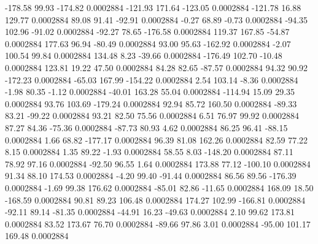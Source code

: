      -178.58       99.93     -174.82     0.0002884
     -121.93      171.64     -123.05     0.0002884
     -121.78       16.88      129.77     0.0002884
       89.08       91.41      -92.91     0.0002884
       -0.27       68.89       -0.73     0.0002884
      -94.35      102.96      -91.02     0.0002884
      -92.27       78.65     -176.58     0.0002884
      119.37      167.85      -54.87     0.0002884
      177.63       96.94      -80.49     0.0002884
       93.00       95.63     -162.92     0.0002884
       -2.07      100.54       99.84     0.0002884
      134.48        8.23      -39.66     0.0002884
     -176.49      102.70      -10.48     0.0002884
      123.81       19.22       47.50     0.0002884
       84.28       82.65      -87.57     0.0002884
       94.32       90.92     -172.23     0.0002884
      -65.03      167.99     -154.22     0.0002884
        2.54      103.14       -8.36     0.0002884
       -1.98       80.35       -1.12     0.0002884
      -40.01      163.28       55.04     0.0002884
     -114.94       15.09       29.35     0.0002884
       93.76      103.69     -179.24     0.0002884
       92.94       85.72      160.50     0.0002884
      -89.33       83.21      -99.22     0.0002884
       93.21       82.50       75.56     0.0002884
        6.51       76.97       99.92     0.0002884
       87.27       84.36      -75.36     0.0002884
      -87.73       80.93        4.62     0.0002884
       86.25       96.41      -88.15     0.0002884
        1.66       68.82     -177.17     0.0002884
       96.39       81.08      162.26     0.0002884
       82.59       77.22        8.15     0.0002884
        1.35       89.22       -1.93     0.0002884
       58.55        8.03     -148.20     0.0002884
       87.11       78.92       97.16     0.0002884
      -92.50       96.55        1.64     0.0002884
      173.88       77.12     -100.10     0.0002884
       91.34       88.10      174.53     0.0002884
       -4.20       99.40      -91.44     0.0002884
       86.56       89.56     -176.39     0.0002884
       -1.69       99.38      176.62     0.0002884
      -85.01       82.86      -11.65     0.0002884
      168.09       18.50     -168.59     0.0002884
       90.81       89.23      106.48     0.0002884
      174.27      102.99     -166.81     0.0002884
      -92.11       89.14      -81.35     0.0002884
      -44.91       16.23      -49.63     0.0002884
        2.10       99.62      173.81     0.0002884
       83.52      173.67       76.70     0.0002884
      -89.66       97.86        3.01     0.0002884
      -95.00      101.17      169.48     0.0002884
